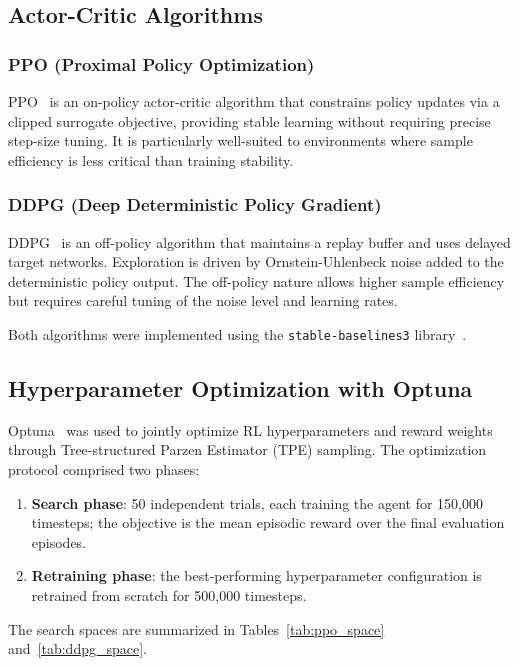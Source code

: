 \documentclass[journal,10pt,twocolumn]{IEEEtran}
\begin{document}
\subsection{Actor-Critic Algorithms}
\label{ssec:algorithms}

\subsubsection{PPO (Proximal Policy Optimization)}
PPO~\cite{schulman2017proximal} is an on-policy actor-critic algorithm that constrains policy updates via a clipped surrogate objective, providing stable learning without requiring precise step-size tuning. It is particularly well-suited to environments where sample efficiency is less critical than training stability.

\subsubsection{DDPG (Deep Deterministic Policy Gradient)}
DDPG~\cite{lillicrap2015continuous} is an off-policy algorithm that maintains a replay buffer and uses delayed target networks. Exploration is driven by Ornstein-Uhlenbeck noise added to the deterministic policy output. The off-policy nature allows higher sample efficiency but requires careful tuning of the noise level and learning rates.

Both algorithms were implemented using the \texttt{stable-baselines3} library~\cite{sb3}.

\subsection{Hyperparameter Optimization with Optuna}
\label{ssec:optuna}

Optuna~\cite{akiba2019optuna} was used to jointly optimize RL hyperparameters and reward weights through Tree-structured Parzen Estimator (TPE) sampling. The optimization protocol comprised two phases:
\begin{enumerate}
  \item \textbf{Search phase}: 50 independent trials, each training the agent for 150,000 timesteps; the objective is the mean episodic reward over the final evaluation episodes.
  \item \textbf{Retraining phase}: the best-performing hyperparameter configuration is retrained from scratch for 500,000 timesteps.
\end{enumerate}

The search spaces are summarized in Tables~\ref{tab:ppo_space} and~\ref{tab:ddpg_space}.
\end{document}
